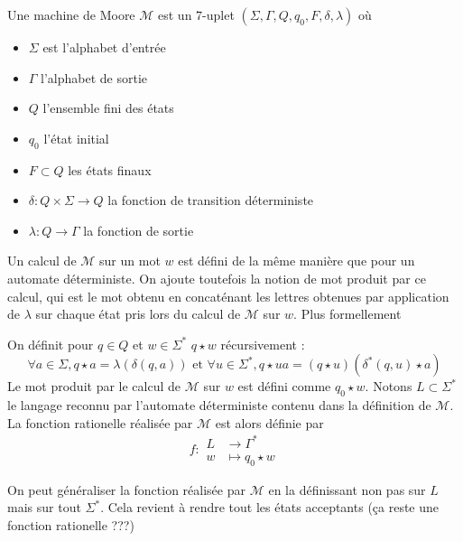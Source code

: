 \documentclass{scrartcl}
\begin{document}
\begin{flushleft}
\begin{define}
    Une machine de Moore $\mathcal{M}$ est un $7$-uplet $(\Sigma, \Gamma, Q, q_0, F, \delta, \lambda)$ où
    \begin{itemize}
        \item $\Sigma$ est l'alphabet d'entrée
        \item $\Gamma$ l'alphabet de sortie
        \item $Q$ l'ensemble fini des états
        \item $q_0$ l'état initial
        \item $F \subset Q$ les états finaux
        \item $\delta : Q \times \Sigma \rightarrow Q$ la fonction de transition déterministe
        \item $\lambda : Q \rightarrow \Gamma$ la fonction de sortie
    \end{itemize}
\end{define}

Un calcul de $\mathcal{M}$ sur un mot $w$ est défini de la même manière que pour un automate déterministe. On ajoute
toutefois la notion de mot produit par ce calcul, qui est le mot obtenu en concaténant les lettres obtenues
par application de $\lambda$ sur chaque état pris lors du calcul de $\mathcal{M}$ sur $w$. Plus formellement

\begin{define}
    On définit pour $q \in Q$ et $w \in \Sigma^*$ $q \star w$ récursivement :
    \[ \forall a \in \Sigma, q \star a = \lambda(\delta(q, a)) \text{ et } \forall u \in \Sigma^*,
    q \star ua = (q \star u)(\delta^*(q, u) \star a) \]
    Le mot produit par le calcul de $\mathcal{M}$ sur $w$ est défini comme $q_0 \star w$. Notons $L \subset \Sigma^*$
    le langage reconnu par l'automate déterministe contenu dans la définition de $\mathcal{M}$. La fonction rationelle
    réalisée par $\mathcal{M}$ est alors définie par
    \[ f : \begin{array}{cl}
        L &\longrightarrow \Gamma^*\\
        w &\longmapsto q_0 \star w
    \end{array} \]
\end{define}

On peut généraliser la fonction réalisée par $\mathcal{M}$ en la définissant non pas sur $L$ mais sur tout
$\Sigma^*$. Cela revient à rendre tout les états acceptants (ça reste une fonction rationelle ???)


\end{flushleft}
\end{document}
